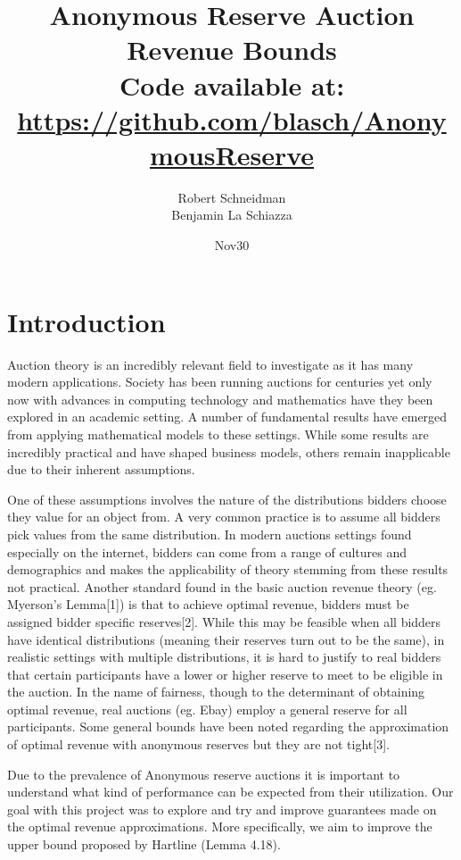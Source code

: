 \documentclass{acm_proc_article-sp}
\begin{document}
\title{Anonymous Reserve Auction Revenue Bounds \\
{\normalsize Code available at: \url{https://github.com/blasch/AnonymousReserve}}} 
\subtitle{}

\author{
\alignauthor 
Robert Schneidman \\
\alignauthor Benjamin La Schiazza\\
}

\date{Nov30}

\maketitle
\begin{abstract}

\end{abstract}

\section{Introduction}
Auction theory is an incredibly relevant field to investigate as it has many modern applications. Society has been running auctions for centuries yet only now with advances in computing technology and mathematics have they been explored in an academic setting. A number of fundamental results have emerged from applying mathematical models to these settings. While some results are incredibly practical and have shaped business models, others remain inapplicable due to their inherent assumptions. 

One of these assumptions involves the nature of the distributions bidders choose they value for an object from. A very common practice is to assume all bidders pick values from the same distribution. In modern auctions settings found especially on the internet, bidders can come from a range of cultures and demographics and makes the applicability of theory stemming from these results not practical. Another standard found in the basic auction revenue theory (eg. Myerson's Lemma[1]) is that to achieve optimal revenue, bidders must be assigned bidder specific reserves[2]. While this may be feasible when all bidders have identical distributions (meaning their reserves turn out to be the same), in realistic settings with multiple distributions, it is hard to justify to real bidders that certain participants have a lower or higher reserve to meet to be eligible in the auction. In the name of fairness, though to the determinant of obtaining optimal revenue, real auctions (eg. Ebay) employ a general reserve for all participants. Some general bounds have been noted regarding the approximation of optimal revenue with anonymous reserves but they are not tight[3]. 

Due to the prevalence of Anonymous reserve auctions it is important to understand what kind of performance can be expected from their utilization. Our goal with this project was to explore and try and improve guarantees made on the optimal revenue approximations. More specifically, we aim to improve the upper bound proposed by Hartline (Lemma 4.18).
\end{document}
